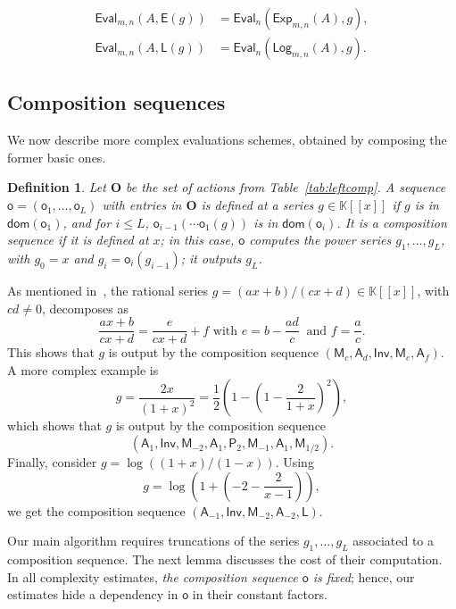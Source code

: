 \documentclass{sig-alternate}
\def\K {\ensuremath{\mathbb{K}}}
\def\op {\ensuremath{\mathbf{O}}}
\def\o {\ensuremath{\mathsf{o}}}
\def\dom {\ensuremath{\mathsf{dom}}}
\def\Lg {\ensuremath{\mathsf{Log}}}
\def\lg {\ensuremath{\mathsf{L}}}
\def\Xp {\ensuremath{\mathsf{Exp}}}
\def\xp {\ensuremath{\mathsf{E}}}
\def\shift {\ensuremath{\mathsf{A}}}
\def\scale {\ensuremath{\mathsf{M}}}
\def\power {\ensuremath{\mathsf{P}}}
\def\inv {\ensuremath{\mathsf{Inv}}}
\def\Eval {\ensuremath{\mathsf{Eval}}}
\newtheorem{Def}{Definition}
\begin{document}
\begin{align}
\label{AR:6}
\Eval_{m,n}(A,\xp(g))& = \Eval_{n}(\Xp_{m,n}(A),g),\tag{A$_6$}\\
\label{AR:7}\tag{A$_7$}
\Eval_{m,n}(A,\lg(g)) &= \Eval_{n}(\Lg_{m,n}(A),g).
\end{align}





\subsection{Composition sequences}\label{ssec:comp}
We now describe more complex evaluations schemes, obtained by
composing the former basic ones. 
\begin{Def}Let $\op$ be the set of actions
from Table~\ref{tab:leftcomp}. A sequence $\o=(\o_1,\dots,\o_L)$ with
entries in $\op$ is \emph{defined at a series} $g\in\K[[x]]$ if $g$ is
in $\dom(\o_1)$, and for $i \le L$, $\o_{i-1}(\cdots \o_1(g))$ is in
$\dom(\o_i)$. It is a \emph{composition sequence} if it is defined at
$x$; in this case, $\o$ \emph{computes} the power series
$g_1,\dots,g_L$, with $g_0 = x$ and $g_i = \o_i(g_{i-1})$; it
\emph{outputs} $g_L$.
\end{Def}

\smallskip{}  As mentioned in~\cite{Pan98}, the
rational series $g=(ax+b)/(cx+d) \in \K[[x]]$, with $cd \ne 0$,
decomposes as
$$\frac{ax+b}{cx+d} = \frac e{cx+d}+f \text{~with~} e=b-\frac{ad}c\
\text{~and~} f =\frac ac.$$ This shows that $g$ is output by the
composition sequence $(\scale_c, \shift_d, \inv, \scale_e, \shift_f)$.
A more complex example is 
\[g=\frac{2x}{(1+x)^2}=\frac12 \left( 1- \left(1- \frac{2}{1+x} \right)^2 \right),\]
which shows that $g$ is output by the composition
sequence
$$(\shift_1,\inv,\scale_{-2},\shift_{1}, \power_2,\scale_{-1},\shift_1,\scale_{1/2}).$$
Finally, consider 
$g=\log((1+x)/(1-x))$. Using 
$$g= \log \left ( 1 + \left ( -2 -\frac{2}{x-1} \right ) \right ),$$
we get the composition sequence
$(\shift_{-1},\inv,\scale_{-2},\shift_{-2}, \lg).$

\smallskip{} Our
main algorithm requires truncations of the series $g_1,\dots,g_L$
associated to a composition sequence. The next lemma discusses the
cost of their computation. In all complexity estimates, \emph{the
composition sequence $\o$ is fixed}; hence, our estimates hide a
dependency in $\o$ in their constant factors.
\end{document}
